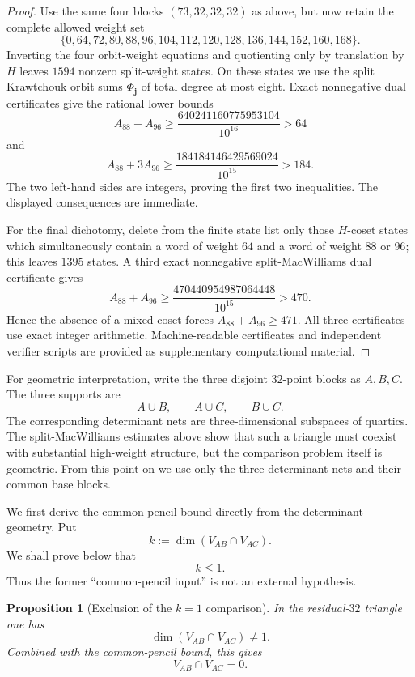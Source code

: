 \documentclass[11pt,reqno]{amsart}
\newtheorem{proposition}[theorem]{Proposition}
\theoremstyle{remark}
\begin{document}
\begin{proof}
Use the same four blocks $(73,32,32,32)$ as above, but now retain the complete allowed weight set
\[
\{0,64,72,80,88,96,104,112,120,128,136,144,152,160,168\}.
\]
Inverting the four orbit-weight equations and quotienting only by translation by $H$ leaves $1594$ nonzero split-weight states.  On these states we use the split Krawtchouk orbit sums $\Phi_{\mathbf j}$ of total degree at most eight.  Exact nonnegative dual certificates give the rational lower bounds
\[
A_{88}+A_{96}\ge
\frac{640241160775953104}{10^{16}}
>64
\]
and
\[
A_{88}+3A_{96}\ge
\frac{184184146429569024}{10^{15}}
>184.
\]
The two left-hand sides are integers, proving the first two inequalities.  The displayed consequences are immediate.

For the final dichotomy, delete from the finite state list only those $H$-coset states which simultaneously contain a word of weight $64$ and a word of weight $88$ or $96$; this leaves $1395$ states.  A third exact nonnegative split-MacWilliams dual certificate gives
\[
A_{88}+A_{96}\ge
\frac{470440954987064448}{10^{15}}
>470.
\]
Hence the absence of a mixed coset forces $A_{88}+A_{96}\ge471$.  All three certificates use exact integer arithmetic.  Machine-readable certificates and independent verifier scripts are provided as supplementary computational material.
\end{proof}

For geometric interpretation, write the three disjoint $32$-point blocks as $A,B,C$.  The three supports are
\[
A\cup B,\qquad A\cup C,\qquad B\cup C.
\]
The corresponding determinant nets are three-dimensional subspaces of quartics.  The split-MacWilliams estimates above show that such a triangle must coexist with substantial high-weight structure, but the comparison problem itself is geometric.  From this point on we use only the three determinant nets and their common base blocks.

We first derive the common-pencil bound directly from the determinant geometry.  Put
\[
k:=\dim(V_{AB}\cap V_{AC}).
\]
We shall prove below that
\[
\boxed{k\le1.} \tag{CP}\label{eq:CP}
\]
Thus the former ``common-pencil input'' is not an external hypothesis.

\begin{proposition}[Exclusion of the $k=1$ comparison]\label{prop:triangle-k1}
In the residual-$32$ triangle one has
\[
\dim(V_{AB}\cap V_{AC})\ne1.
\]
Combined with the common-pencil bound, this gives
\[
\boxed{V_{AB}\cap V_{AC}=0.}
\]
\end{proposition}
\end{document}
